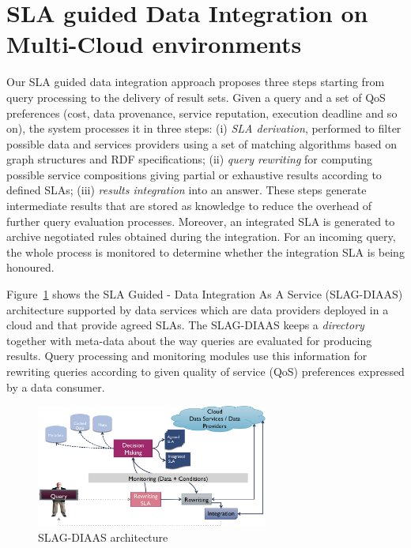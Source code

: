 \documentclass{llncs}
\begin{document}

  







\section{SLA guided Data Integration on Multi-Cloud environments}\label{sec:approach}
Our SLA guided data  integration approach proposes three steps starting from  query processing   to the delivery of  result sets.
Given a query and a set of QoS preferences (cost, data provenance, service reputation, execution deadline and so on), the system processes it in three steps:  (i)  {\em SLA derivation}, performed to filter possible data and services providers using a set of matching algorithms based on  graph structures and RDF specifications;
(ii)  {\em query rewriting} for computing possible service compositions giving partial or exhaustive  results according to defined SLAs; (iii)  {\em results  integration} into an answer. 
These steps generate intermediate results that are stored as knowledge  to reduce the overhead of further query evaluation processes. Moreover, an integrated SLA is generated to archive  negotiated rules obtained during  the integration. For an incoming query, the whole process is monitored to determine whether the integration SLA is being honoured.

Figure~\ref{fig_sim} shows the SLA Guided - Data Integration As A Service (SLAG-DIAAS) architecture  supported by data services which are data providers deployed in a cloud and that provide agreed SLAs. 
The SLAG-DIAAS keeps a \textit{directory} together with meta-data about the way queries are evaluated for producing results.
Query processing and monitoring modules use this information for rewriting queries according to given quality of service (QoS) preferences expressed by a data consumer.
\begin{figure}[!t]
\centering
\includegraphics[width=3in]{figs/arch}
\caption{SLAG-DIAAS architecture}
\label{fig_sim}
\end{figure}
\end{document}
